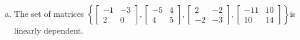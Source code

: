 \begin{exerciseAnswer}
\begin{enumerate}[(a)]
\item The set of matrices \( \left\{ \left[\begin{array}{cc}
-1 & -3 \\
2 & 0
\end{array}\right] , \left[\begin{array}{cc}
-5 & 4 \\
4 & 5
\end{array}\right] , \left[\begin{array}{cc}
2 & -2 \\
-2 & -3
\end{array}\right] , \left[\begin{array}{cc}
-11 & 10 \\
10 & 14
\end{array}\right] \right\} \)is linearly dependent.
\end{enumerate}
    
\end{exerciseAnswer}
    
